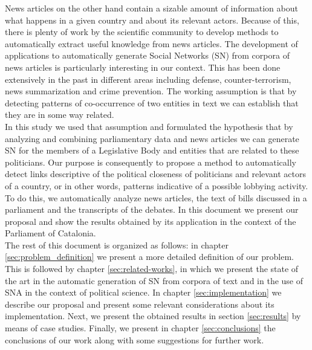 News articles on the other hand contain a sizable amount of information about what happens in a given country and about its relevant actors. Because of this, there is plenty of work by the scientific community to develop methods to automatically extract useful knowledge from news articles. The development of applications to automatically generate Social Networks (SN) from corpora of news articles is particularly interesting in our context. This has been done extensively in the past in different areas including defense, counter-terrorism, news summarization and crime prevention. The working assumption is that by detecting patterns of co-occurrence of two entities in text we can establish that they are in some way related.  \\

In this study we used that assumption and formulated the hypothesis that by analyzing and combining parliamentary data and news articles we can generate SN for the members of a Legislative Body and entities that are related to these politicians. Our purpose is consequently to propose a method to automatically detect links descriptive of the political closeness of politicians and relevant actors of a country, or in other words, patterns indicative of a possible lobbying activity. To do this, we automatically analyze news articles, the text of bills discussed in a parliament and the transcripts of the debates.   In this document we present our proposal and show the results obtained by its application in the context of the Parliament of Catalonia. \\

The rest of this document is organized as follows: in chapter \ref{sec:problem_definition} we present a more detailed definition of our problem. This is followed by chapter \ref{sec:related-works}, in which we present the state of the art in the automatic generation of SN from corpora of text and in the use of SNA in the context of political science. In chapter \ref{sec:implementation} we describe our proposal and present some relevant considerations about its implementation. Next, we present the obtained results in section \ref{sec:results} by means of case studies. Finally, we present in chapter \ref{sec:conclusions} the conclusions of our work along with some suggestions for further work.

